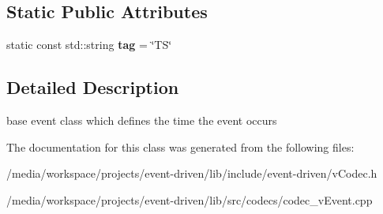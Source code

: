 \subsection*{Static Public Attributes}
\begin{DoxyCompactItemize}
\item 
\mbox{\label{classev_1_1vEvent_a54bcc0830c5993b56f1f47e23df1de8e}} 
static const std\+::string {\bfseries tag} = \char`\"{}TS\char`\"{}
\end{DoxyCompactItemize}


\subsection{Detailed Description}
base event class which defines the time the event occurs 

The documentation for this class was generated from the following files\+:\begin{DoxyCompactItemize}
\item 
/media/workspace/projects/event-\/driven/lib/include/event-\/driven/v\+Codec.\+h\item 
/media/workspace/projects/event-\/driven/lib/src/codecs/codec\+\_\+v\+Event.\+cpp\end{DoxyCompactItemize}
